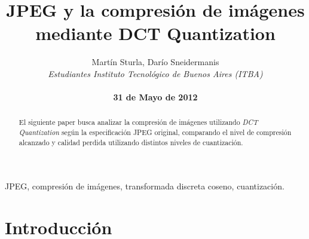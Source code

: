 \documentclass[%
final,
%
reprint,
%
notitlepage,
narroweqnarray,
inline,
twoside,
invited
]{ieee}
\begin{document}
\title[JPEG: Compresión de Imágenes]{%
JPEG y la compresión de imágenes\\ mediante DCT Quantization}

\author[Sturla, Sneidermanis]{Martín Sturla, Darío Sneidermanis\\\textit{Estudiantes 
       Instituto Tecnológico de Buenos Aires (ITBA)}\\
\\\textbf{31 de Mayo de 2012}
}



\lognumber{}
\pubitemident{}


\maketitle               

\begin{abstract} 
El siguiente paper busca analizar la compresión de imágenes utilizando \textit{DCT Quantization} según 
la especificación JPEG original, comparando el nivel de compresión alcanzado y calidad perdida 
utilizando distintos niveles de cuantización.
\end{abstract}

\begin{keywords}
JPEG, compresión de imágenes, transformada discreta coseno, cuantización.
\end{keywords}

\section{Introducción}
\end{document}
